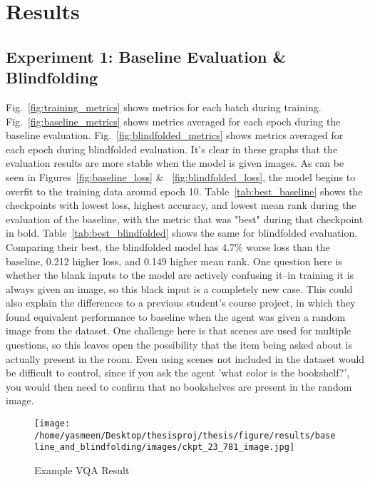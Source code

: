 \chapter{Results}
\section{Experiment 1: Baseline Evaluation \& Blindfolding}
Fig.~\ref{fig:training_metrics} shows metrics for each batch during training. Fig.~\ref{fig:baseline_metrics} shows metrics averaged for each epoch during the baseline evaluation. Fig.~\ref{fig:blindfolded_metrics} shows metrics averaged for each epoch during blindfolded evaluation. It's clear in these graphs that the evaluation results are more stable when the model is given images. As can be seen in Figures~\ref{fig:baseline_loss} \& ~\ref{fig:blindfolded_loss}, the model begins to overfit to the training data around epoch 10. \newline
Table~\ref{tab:best_baseline} shows the checkpoints with lowest loss, highest accuracy, and lowest mean rank during the evaluation of the baseline, with the metric that was "best" during that checkpoint in bold. Table~\ref{tab:best_blindfolded} shows the same for blindfolded evaluation. Comparing their best, the blindfolded model has 4.7\% worse loss than the baseline, 0.212 higher loss, and 0.149 higher mean rank. \newline
One question here is whether the blank inputs to the model are actively confusing it--in training it is always given an image, so this black input is a completely new case. This could also explain the differences to a previous student's course project, in which they found equivalent performance to baseline when the agent was given a random image from the dataset. One challenge here is that scenes are used for multiple questions, so this leaves open the possibility that the item being asked about is actually present in the room. Even using scenes not included in the dataset would be difficult to control, since if you ask the agent 'what color is the bookshelf?', you would then need to confirm that no bookshelves are present in the random image. \newline
\begin{figure}[ht!]
	\centering
	\texttt{[image: /home/yasmeen/Desktop/thesisproj/thesis/figure/results/baseline\_and\_blindfolding/images/ckpt\_23\_781\_image.jpg]}
	\caption{Example VQA Result}
	\label{fig:example_vqa_result}
\end{figure}
	

